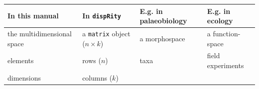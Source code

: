 \documentclass[]{book}
\theoremstyle{definition}
\theoremstyle{definition}
\theoremstyle{definition}
\theoremstyle{remark}
\begin{document}
\begin{longtable}[]{@{}llll@{}}
\toprule
\begin{minipage}[b]{0.20\columnwidth}\raggedright\strut
In this manual\strut
\end{minipage} & \begin{minipage}[b]{0.20\columnwidth}\raggedright\strut
In \texttt{dispRity}\strut
\end{minipage} & \begin{minipage}[b]{0.23\columnwidth}\raggedright\strut
E.g. in palaeobiology\strut
\end{minipage} & \begin{minipage}[b]{0.17\columnwidth}\raggedright\strut
E.g. in ecology\strut
\end{minipage}\tabularnewline
\midrule
\endhead
\begin{minipage}[t]{0.20\columnwidth}\raggedright\strut
the multidimensional space\strut
\end{minipage} & \begin{minipage}[t]{0.20\columnwidth}\raggedright\strut
a \texttt{matrix} object (\(n\times k\))\strut
\end{minipage} & \begin{minipage}[t]{0.23\columnwidth}\raggedright\strut
a morphospace\strut
\end{minipage} & \begin{minipage}[t]{0.17\columnwidth}\raggedright\strut
a function-space\strut
\end{minipage}\tabularnewline
\begin{minipage}[t]{0.20\columnwidth}\raggedright\strut
elements\strut
\end{minipage} & \begin{minipage}[t]{0.20\columnwidth}\raggedright\strut
rows (\(n\))\strut
\end{minipage} & \begin{minipage}[t]{0.23\columnwidth}\raggedright\strut
taxa\strut
\end{minipage} & \begin{minipage}[t]{0.17\columnwidth}\raggedright\strut
field experiments\strut
\end{minipage}\tabularnewline
\begin{minipage}[t]{0.20\columnwidth}\raggedright\strut
dimensions\strut
\end{minipage} & \begin{minipage}[t]{0.20\columnwidth}\raggedright\strut
columns (\(k\))\strut
\end{minipage} & \begin{minipage}[t]{0.23\columnwidth}\raggedright\strut

\end{minipage}
\end{longtable}
\end{document}
